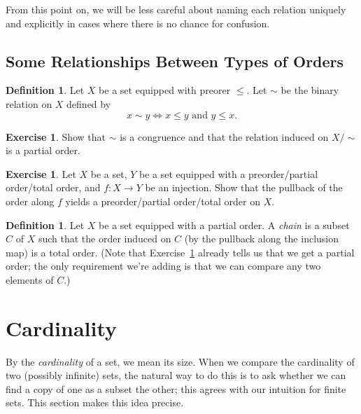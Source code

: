 \documentclass[letterpaper]{article}
\theoremstyle{definition}
\newtheorem{definition}[theorem]{Definition}
\newtheorem{exercise}[theorem]{Exercise}
\newcommand{\defterm}{\emph}
\begin{document}
From this point on, we will be less careful about naming each relation
uniquely and explicitly in cases where there is no chance for
confusion.

\subsection{Some Relationships Between Types of Orders}

\begin{definition}\label{def:preorder-equiv}
  Let \(X\) be a set equipped with preorer \(\leq\).  Let \(\sim\) be
  the binary relation on \(X\) defined by
  \[x \sim y \iff x \leq y \text{ and } y \leq x \text{.}\]
\end{definition}

\begin{exercise}\label{exercise:quotient-preorder-equiv}
  Show that \(\sim\) is a congruence and that the relation induced on
  \(X/{\sim}\) is a partial order.
\end{exercise}

\begin{exercise}\label{exercise:pullback-order-injection}
  Let \(X\) be a set, \(Y\) be a set equipped with a preorder/partial
  order/total order, and \(f:X \to Y\) be an injection.  Show that the
  pullback of the order along \(f\) yields a preorder/partial
  order/total order on \(X\).
\end{exercise}

\begin{definition}
  Let \(X\) be a set equipped with a partial order.  A \defterm{chain}
  is a subset \(C\) of \(X\) such that the order induced on \(C\) (by
  the pullback along the inclusion map) is a total order.  (Note that
  Exercise~\ref{exercise:pullback-order-injection} already tells us
  that we get a partial order; the only requirement we're adding is
  that we can compare any two elements of \(C\).)
\end{definition}

\section{Cardinality}
By the \defterm{cardinality} of a set, we mean its size.  When we
compare the cardinality of two (possibly infinite) sets, the natural
way to do this is to ask whether we can find a copy of one as a subset
the other; this agrees with our intuition for finite sets.  This
section makes this idea precise.
\end{document}
